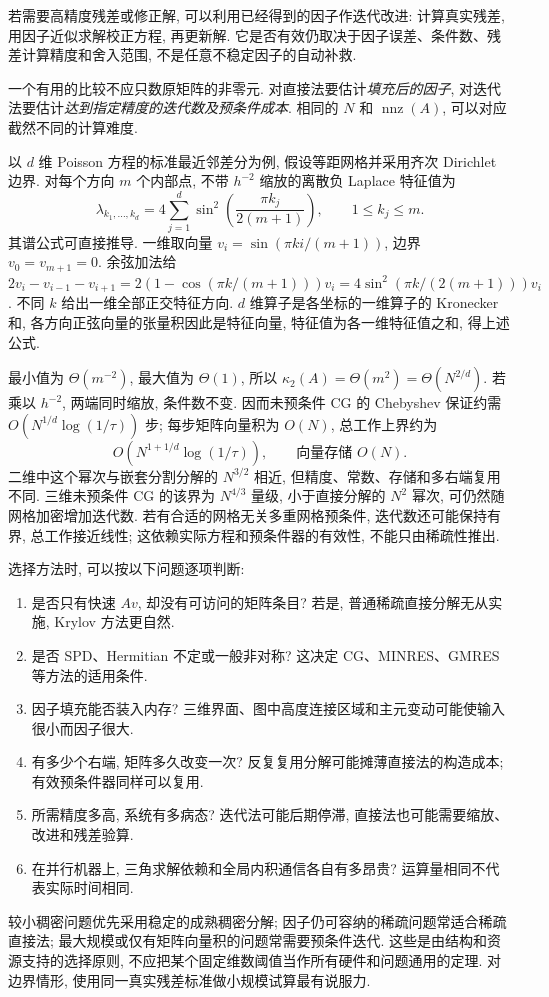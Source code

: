 若需要高精度残差或修正解, 可以利用已经得到的因子作迭代改进: 计算真实残差, 用因子近似求解校正方程, 再更新解. 它是否有效仍取决于因子误差、条件数、残差计算精度和舍入范围, 不是任意不稳定因子的自动补救.

一个有用的比较不应只数原矩阵的非零元. 对直接法要估计\emph{填充后的因子}, 对迭代法要估计\emph{达到指定精度的迭代数及预条件成本}. 相同的 $N$ 和 $\operatorname{nnz}(A)$, 可以对应截然不同的计算难度.

以 $d$ 维 Poisson 方程的标准最近邻差分为例, 假设等距网格并采用齐次 Dirichlet 边界. 对每个方向 $m$ 个内部点, 不带 $h^{-2}$ 缩放的离散负 Laplace 特征值为
\[
\lambda_{k_1,\ldots,k_d}
=4\sum_{j=1}^d\sin^2\left(\frac{\pi k_j}{2(m+1)}\right),
\qquad 1\le k_j\le m.
\]
其谱公式可直接推导. 一维取向量 $v_i=\sin(\pi ki/(m+1))$, 边界 $v_0=v_{m+1}=0$. 余弦加法给 $2v_i-v_{i-1}-v_{i+1}=2(1-\cos(\pi k/(m+1)))v_i=4\sin^2(\pi k/(2(m+1)))v_i$. 不同 $k$ 给出一维全部正交特征方向. $d$ 维算子是各坐标的一维算子的 Kronecker 和, 各方向正弦向量的张量积因此是特征向量, 特征值为各一维特征值之和, 得上述公式.

最小值为 $\Theta(m^{-2})$, 最大值为 $\Theta(1)$, 所以 $\kappa_2(A)=\Theta(m^2)=\Theta(N^{2/d})$. 若乘以 $h^{-2}$, 两端同时缩放, 条件数不变. 因而未预条件 CG 的 Chebyshev 保证约需
$O(N^{1/d}\log(1/\tau))$ 步; 每步矩阵向量积为 $O(N)$, 总工作上界约为
\[
O(N^{1+1/d}\log(1/\tau)),\qquad\text{向量存储 }O(N).
\]
二维中这个幂次与嵌套分割分解的 $N^{3/2}$ 相近, 但精度、常数、存储和多右端复用不同. 三维未预条件 CG 的该界为 $N^{4/3}$ 量级, 小于直接分解的 $N^2$ 幂次, 可仍然随网格加密增加迭代数. 若有合适的网格无关多重网格预条件, 迭代数还可能保持有界, 总工作接近线性; 这依赖实际方程和预条件器的有效性, 不能只由稀疏性推出.

选择方法时, 可以按以下问题逐项判断:
\begin{enumerate}
\item 是否只有快速 $Av$, 却没有可访问的矩阵条目? 若是, 普通稀疏直接分解无从实施, Krylov 方法更自然.
\item 是否 SPD、Hermitian 不定或一般非对称? 这决定 CG、MINRES、GMRES 等方法的适用条件.
\item 因子填充能否装入内存? 三维界面、图中高度连接区域和主元变动可能使输入很小而因子很大.
\item 有多少个右端, 矩阵多久改变一次? 反复复用分解可能摊薄直接法的构造成本; 有效预条件器同样可以复用.
\item 所需精度多高, 系统有多病态? 迭代法可能后期停滞, 直接法也可能需要缩放、改进和残差验算.
\item 在并行机器上, 三角求解依赖和全局内积通信各自有多昂贵? 运算量相同不代表实际时间相同.
\end{enumerate}
较小稠密问题优先采用稳定的成熟稠密分解; 因子仍可容纳的稀疏问题常适合稀疏直接法; 最大规模或仅有矩阵向量积的问题常需要预条件迭代. 这些是由结构和资源支持的选择原则, 不应把某个固定维数阈值当作所有硬件和问题通用的定理. 对边界情形, 使用同一真实残差标准做小规模试算最有说服力.

